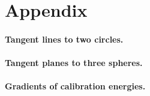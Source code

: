 \section{Appendix}

\paragraph{Tangent lines to two circles.}
\label{app:pillcorr}
% 

\paragraph{Tangent planes to three spheres.}
\label{app:wedgecorr}
% 

\paragraph{Gradients of calibration energies.}
\label{app:gradients}
% 

